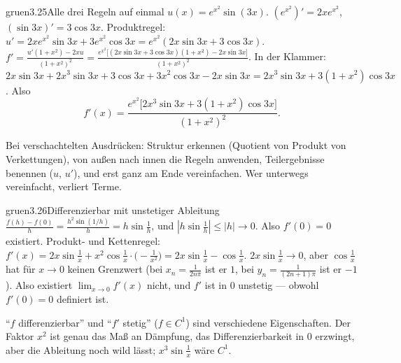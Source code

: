 \begin{loesungkarte}{gruen}{3.25}{Alle drei Regeln auf einmal}
$u(x) = e^{x^{2}}\sin(3x)$. $(e^{x^{2}})' = 2xe^{x^{2}}$, $(\sin3x)' = 3\cos3x$. Produktregel: $u' = 2xe^{x^{2}}\sin3x + 3e^{x^{2}}\cos3x = e^{x^{2}}(2x\sin3x + 3\cos3x)$.
$f' = \frac{u'(1 + x^{2}) - 2xu}{(1 + x^{2})^{2}} = \frac{e^{x^{2}}\bigl[(2x\sin3x + 3\cos3x)(1 + x^{2}) - 2x\sin3x\bigr]}{(1 + x^{2})^{2}}$.
In der Klammer: $2x\sin3x + 2x^{3}\sin3x + 3\cos3x + 3x^{2}\cos3x - 2x\sin3x = 2x^{3}\sin3x + 3(1 + x^{2})\cos3x$. Also
\[ f'(x) = \frac{e^{x^{2}}\bigl[2x^{3}\sin3x + 3(1 + x^{2})\cos3x\bigr]}{(1 + x^{2})^{2}}. \]
\begin{mitnehmen}\kastentext
Bei verschachtelten Ausdrücken: Struktur erkennen (Quotient von Produkt von Verkettungen), von außen nach innen die Regeln anwenden, Teilergebnisse benennen ($u$, $u'$), und erst ganz am Ende vereinfachen. Wer unterwegs vereinfacht, verliert Terme.
\end{mitnehmen}
\end{loesungkarte}

\begin{loesungkarte}{gruen}{3.26}{Differenzierbar mit unstetiger Ableitung}
$\frac{f(h) - f(0)}h = \frac{h^{2}\sin(1/h)}h = h\sin\frac1h$, und $|h\sin\frac1h|\le|h|\to0$. Also $f'(0) = 0$ existiert.
Produkt- und Kettenregel: $f'(x) = 2x\sin\frac1x + x^{2}\cos\frac1x\cdot\bigl(-\frac1{x^{2}}\bigr) = 2x\sin\frac1x - \cos\frac1x$.
$2x\sin\frac1x\to0$, aber $\cos\frac1x$ hat für $x\to0$ keinen Grenzwert (bei $x_n = \frac1{2n\pi}$ ist er $1$, bei $y_n = \frac1{(2n + 1)\pi}$ ist er $-1$). Also existiert $\lim_{x\to0}f'(x)$ nicht, und $f'$ ist in $0$ unstetig --- obwohl $f'(0) = 0$ definiert ist.
\begin{mitnehmen}\kastentext
\enquote{$f$ differenzierbar} und \enquote{$f'$ stetig} ($f\in C^{1}$) sind verschiedene Eigenschaften. Der Faktor $x^{2}$ ist genau das Maß an Dämpfung, das Differenzierbarkeit in $0$ erzwingt, aber die Ableitung noch wild lässt; $x^{3}\sin\frac1x$ wäre $C^{1}$.
\end{mitnehmen}
\end{loesungkarte}

